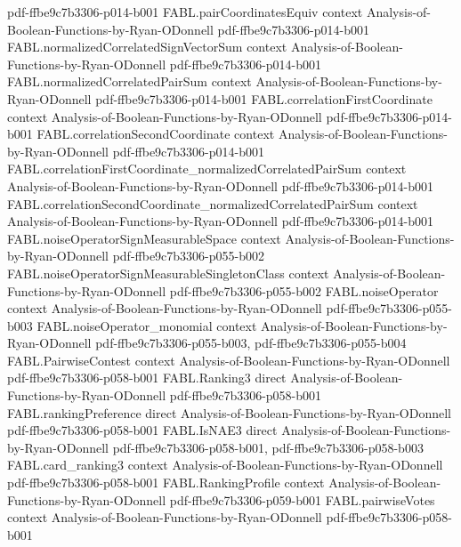 \begin{theorem}
  {pdf-ffbe9c7b3306-p014-b001}
\proofstep
  {FABL.pairCoordinatesEquiv}
  {context}
  {Analysis-of-Boolean-Functions-by-Ryan-ODonnell}
  {pdf-ffbe9c7b3306-p014-b001}
\proofstep
  {FABL.normalizedCorrelatedSignVectorSum}
  {context}
  {Analysis-of-Boolean-Functions-by-Ryan-ODonnell}
  {pdf-ffbe9c7b3306-p014-b001}
\proofstep
  {FABL.normalizedCorrelatedPairSum}
  {context}
  {Analysis-of-Boolean-Functions-by-Ryan-ODonnell}
  {pdf-ffbe9c7b3306-p014-b001}
\proofstep
  {FABL.correlationFirstCoordinate}
  {context}
  {Analysis-of-Boolean-Functions-by-Ryan-ODonnell}
  {pdf-ffbe9c7b3306-p014-b001}
\proofstep
  {FABL.correlationSecondCoordinate}
  {context}
  {Analysis-of-Boolean-Functions-by-Ryan-ODonnell}
  {pdf-ffbe9c7b3306-p014-b001}
\proofstep
  {FABL.correlationFirstCoordinate_normalizedCorrelatedPairSum}
  {context}
  {Analysis-of-Boolean-Functions-by-Ryan-ODonnell}
  {pdf-ffbe9c7b3306-p014-b001}
\proofstep
  {FABL.correlationSecondCoordinate_normalizedCorrelatedPairSum}
  {context}
  {Analysis-of-Boolean-Functions-by-Ryan-ODonnell}
  {pdf-ffbe9c7b3306-p014-b001}
\proofstep
  {FABL.noiseOperatorSignMeasurableSpace}
  {context}
  {Analysis-of-Boolean-Functions-by-Ryan-ODonnell}
  {pdf-ffbe9c7b3306-p055-b002}
\proofstep
  {FABL.noiseOperatorSignMeasurableSingletonClass}
  {context}
  {Analysis-of-Boolean-Functions-by-Ryan-ODonnell}
  {pdf-ffbe9c7b3306-p055-b002}
\proofstep
  {FABL.noiseOperator}
  {context}
  {Analysis-of-Boolean-Functions-by-Ryan-ODonnell}
  {pdf-ffbe9c7b3306-p055-b003}
\proofstep
  {FABL.noiseOperator_monomial}
  {context}
  {Analysis-of-Boolean-Functions-by-Ryan-ODonnell}
  {pdf-ffbe9c7b3306-p055-b003,
    pdf-ffbe9c7b3306-p055-b004}
\proofstep
  {FABL.PairwiseContest}
  {context}
  {Analysis-of-Boolean-Functions-by-Ryan-ODonnell}
  {pdf-ffbe9c7b3306-p058-b001}
\proofstep
  {FABL.Ranking3}
  {direct}
  {Analysis-of-Boolean-Functions-by-Ryan-ODonnell}
  {pdf-ffbe9c7b3306-p058-b001}
\proofstep
  {FABL.rankingPreference}
  {direct}
  {Analysis-of-Boolean-Functions-by-Ryan-ODonnell}
  {pdf-ffbe9c7b3306-p058-b001}
\proofstep
  {FABL.IsNAE3}
  {direct}
  {Analysis-of-Boolean-Functions-by-Ryan-ODonnell}
  {pdf-ffbe9c7b3306-p058-b001,
    pdf-ffbe9c7b3306-p058-b003}
\proofstep
  {FABL.card_ranking3}
  {context}
  {Analysis-of-Boolean-Functions-by-Ryan-ODonnell}
  {pdf-ffbe9c7b3306-p058-b001}
\proofstep
  {FABL.RankingProfile}
  {context}
  {Analysis-of-Boolean-Functions-by-Ryan-ODonnell}
  {pdf-ffbe9c7b3306-p059-b001}
\proofstep
  {FABL.pairwiseVotes}
  {context}
  {Analysis-of-Boolean-Functions-by-Ryan-ODonnell}
  {pdf-ffbe9c7b3306-p058-b001}
\proofstep

\end{theorem}
